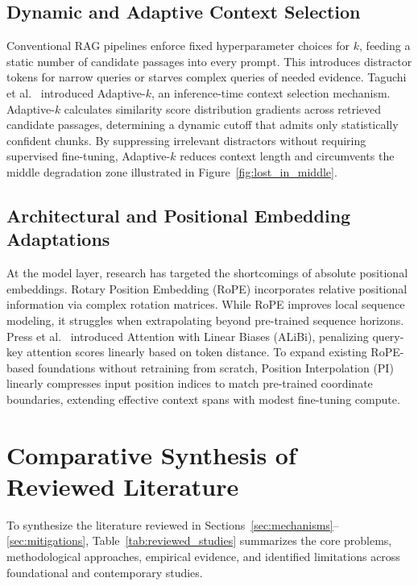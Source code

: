 \documentclass[manuscript]{acmart}
\begin{document}
\subsection{Dynamic and Adaptive Context Selection}
Conventional RAG pipelines enforce fixed hyperparameter choices for $k$, feeding a static number of candidate passages into every prompt. This introduces distractor tokens for narrow queries or starves complex queries of needed evidence. Taguchi et al.~\cite{taguchi2025adaptivek} introduced Adaptive-$k$, an inference-time context selection mechanism. Adaptive-$k$ calculates similarity score distribution gradients across retrieved candidate passages, determining a dynamic cutoff that admits only statistically confident chunks. By suppressing irrelevant distractors without requiring supervised fine-tuning, Adaptive-$k$ reduces context length and circumvents the middle degradation zone illustrated in Figure~\ref{fig:lost_in_middle}.

\subsection{Architectural and Positional Embedding Adaptations}
At the model layer, research has targeted the shortcomings of absolute positional embeddings. Rotary Position Embedding (RoPE) \cite{su2024roformer} incorporates relative positional information via complex rotation matrices. While RoPE improves local sequence modeling, it struggles when extrapolating beyond pre-trained sequence horizons. Press et al.~\cite{press2022alibi} introduced Attention with Linear Biases (ALiBi), penalizing query-key attention scores linearly based on token distance. To expand existing RoPE-based foundations without retraining from scratch, Position Interpolation (PI) \cite{chen2023interpolation} linearly compresses input position indices to match pre-trained coordinate boundaries, extending effective context spans with modest fine-tuning compute.

\section{Comparative Synthesis of Reviewed Literature}\label{sec:comparative}
To synthesize the literature reviewed in Sections~\ref{sec:mechanisms}--\ref{sec:mitigations}, Table~\ref{tab:reviewed_studies} summarizes the core problems, methodological approaches, empirical evidence, and identified limitations across foundational and contemporary studies.
\end{document}
